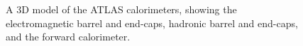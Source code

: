 \begin{figure}[htbp]
	\centering
	\caption{A 3D model of the ATLAS calorimeters, showing the electromagnetic barrel and end-caps, hadronic barrel and end-caps, and the forward calorimeter.}
	\label{fig:ATLAS-calorimeters}
\end{figure}

